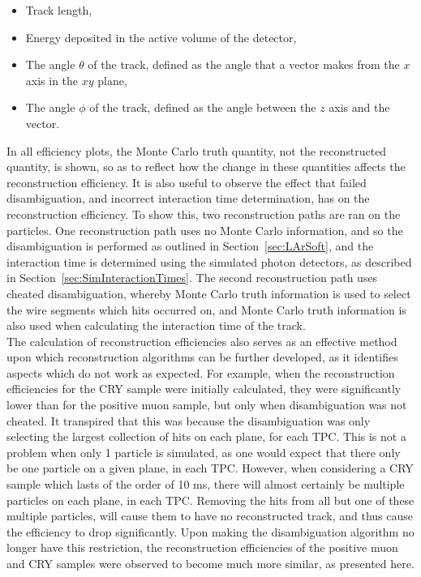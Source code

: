 \begin{itemize}
\item Track length,
\item Energy deposited in the active volume of the detector,
\item The angle $\theta$ of the track, defined as the angle that a vector makes from the $x$ axis in the $xy$ plane,
\item The angle $\phi$ of the track, defined as the angle between the $z$ axis and the vector.
\end{itemize}
In all efficiency plots, the Monte Carlo truth quantity, not the reconstructed quantity, is shown, so as to reflect how the change in these quantities affects the reconstruction efficiency. It is also useful to observe the effect that failed disambiguation, and incorrect interaction time determination, has on the reconstruction efficiency. To show this, two reconstruction paths are ran on the particles. One reconstruction path uses no Monte Carlo information, and so the disambiguation is performed as outlined in Section~\ref{sec:LArSoft}, and the interaction time is determined using the simulated photon detectors, as described in Section~\ref{sec:SimInteractionTimes}. The second reconstruction path uses cheated disambiguation, whereby Monte Carlo truth information is used to select the wire segments which hits occurred on, and Monte Carlo truth information is also used when calculating the interaction time of the track. \\

The calculation of reconstruction efficiencies also serves as an effective method upon which reconstruction algorithms can be further developed, as it identifies aspects which do not work as expected. For example, when the reconstruction efficiencies for the CRY sample were initially calculated, they were significantly lower than for the positive muon sample, but only when disambiguation was not cheated. It transpired that this was because the disambiguation was only selecting the largest collection of hits on each plane, for each TPC. This is not a problem when only 1 particle is simulated, as one would expect that there only be one particle on a given plane, in each TPC. However, when considering a CRY sample which lasts of the order of 10 ms, there will almost certainly be multiple particles on each plane, in each TPC. Removing the hits from all but one of these multiple particles, will cause them to have no reconstructed track, and thus cause the efficiency to drop significantly. Upon making the disambiguation algorithm no longer have this restriction, the reconstruction efficiencies of the positive muon and CRY samples were observed to become much more similar, as presented here. \\

